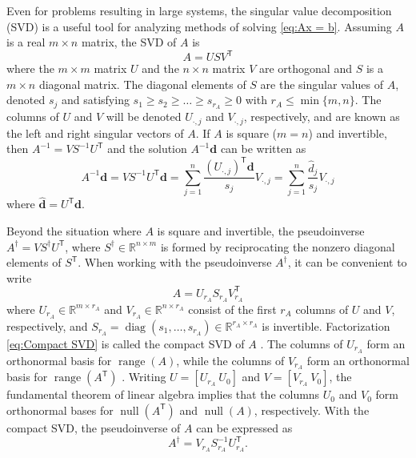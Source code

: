 \documentclass[12pt]{article}
\newcommand{\mA}{m}	%
\newcommand{\rA}{r_A}	%
\newcommand{\dVec}{\mathbf{d}}	%
\newcommand{\trans}[1]{{#1}^\mathsf{T}}	%
\newcommand{\inv}[1]{{#1}^{-1}}	%
\newcommand{\pinv}[1]{{#1}^\dagger}	%
\DeclareMathOperator{\diag}{diag}	%
\DeclareMathOperator{\range}{range}	%
\DeclareMathOperator{\nullspace}{null}	%
\newcommand{\singular}{s}	%
\newcommand{\svd}[1]{\widehat{#1}}	%
\begin{document}
Even for problems resulting in large systems, the singular value decomposition (SVD) is a useful tool for analyzing methods of solving \eqref{eq:Ax = b}.  Assuming $A$ is a real $\mA \times n$ matrix, the SVD of $A$ is
\begin{equation}
\label{eq:SVD}
A = US\trans{V}
\end{equation}
where the $\mA \times \mA$ matrix $U$ and the $n \times n$ matrix $V$ are orthogonal and $S$ is a $\mA \times n$ diagonal matrix. The diagonal elements of $S$ are the singular values of $A$, denoted $\singular_j$ and satisfying $\singular_1 \geq \singular_2 \geq \ldots \geq \singular_{\rA} \geq 0$ with $\rA \leq \min\{\mA,n\}$. The columns of $U$ and $V$ will be denoted $U_{\cdot,j}$ and $V_{\cdot,j}$, respectively, and are known as the left and right singular vectors of $A$. If $A$ is square ($\mA = n$) and invertible, then $\inv{A} = V\inv{S}\trans{U}$ and the solution $\inv{A}\dVec$ can be written as
\begin{equation}
\label{eq:InvProd}
\inv{A}\dVec = VS^{-1}{\trans{U}}\dVec = \sum_{j=1}^{n} \frac{{\trans{(U_{\cdot,j})}}\dVec}{\singular_j}V_{\cdot,j} = \sum_{j=1}^{n} \frac{\svd{d}_j}{\singular_j}V_{\cdot,j}
\end{equation}
where $\svd{\dVec} = \trans{U}\dVec$. \par 
Beyond the situation where $A$ is square and invertible, the pseudoinverse \cite{Penrose1955} $\pinv{A} = V\pinv{S}\trans{U}$, where $\pinv{S} \in \mathbb{R}^{n \times \mA}$ is formed by reciprocating the nonzero diagonal elements of $\trans{S}$. When working with the pseudoinverse $\pinv{A}$, it can be convenient to write
\begin{equation}
\label{eq:Compact SVD}
A = U_{\rA}S_{\rA}\trans{V}_{\rA}
\end{equation}
where $U_{\rA} \in \mathbb{R}^{\mA \times \rA}$ and $V_{\rA} \in \mathbb{R}^{n \times \rA}$ consist of the first $\rA$ columns of $U$ and $V$, respectively, and $S_{\rA} = \diag(\singular_1,\ldots,\singular_{\rA}) \in \mathbb{R}^{\rA \times \rA}$ is invertible. Factorization \eqref{eq:Compact SVD} is called the compact SVD of $A$ \cite{ABT,Leon2010}. The columns of $U_{\rA}$ form an orthonormal basis for $\range(A)$, while the columns of $V_{\rA}$ form an orthonormal basis for $\range(\trans{A})$ \cite[p.~340]{Leon2010}. Writing $U = [U_{\rA} ~ U_0]$ and $V = [V_{\rA} ~ V_0]$, the fundamental theorem of linear algebra \cite{Strang1993} implies that the columns $U_0$  and $V_0$ form orthonormal bases for $\nullspace(\trans{A})$ and $\nullspace(A)$, respectively. With the compact SVD, the pseudoinverse of $A$ can be expressed as 
\begin{equation}
\label{eq:Pseudoinverse}
    \pinv{A} = V_{\rA}\inv{S}_{\rA}\trans{U}_{\rA}.
\end{equation}
\end{document}
